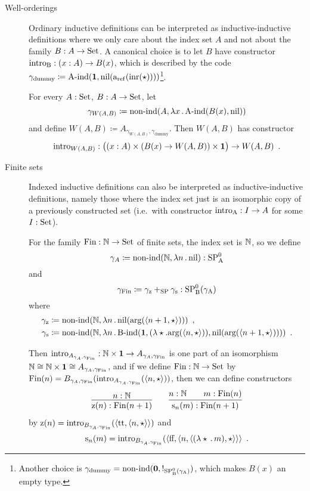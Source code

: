 \documentclass{article}
\begin{document}
\begin{description}
\item[Well-orderings] Ordinary inductive definitions can be
  interpreted as inductive-inductive definitions where we only care
  about the index set $A$ and not about the family $B : A \to \text{Set}$. A
  canonical choice is to let $B$ have constructor $\text{intro}_{\mathrm{B}} : (x : A)
  \to B(x)$, which is described by the code $\gamma_{\text{dummy}}
  \coloneqq \text{A-ind}(\mathbf{1},
  \text{nil}(\text{a}_{\mathrm{ref}}(\text{inr}(\star))))$\footnote{Another choice is
    $\gamma_{\text{dummy}} = \text{non-ind}(\mathbf{0}, !_{\text{SP}^{0}_{\mathrm{B}}(\gamma_{\mathrm{A}})})$, which makes $B(x)$
    an empty type.}.

  For every $A : \text{Set}$, $B : A \to \text{Set}$, let
  \[
  \gamma_{W(A, B)} \coloneqq \text{non-ind}(A, \lambda x\,.\,\text{A-ind}(B(x),\text{nil}))
  \]
  and define $W(A, B) \coloneqq A_{\gamma_{W(A, B)},
    \gamma_{\text{dummy}}}$.  Then $W(A, B)$ has constructor
  \[
  \text{intro}_{W(A, B)} : \big((x : A) \times (B(x) \to W(A, B)) \times \mathbf{1}\big) \to W(A, B) \enspace .
  \]

\item[Finite sets] Indexed inductive definitions can also be
  interpreted as inductive-inductive definitions, namely those where
  the index set just is an isomorphic copy of a previously constructed
  set (i.e.\ with constructor $\text{intro}_{\mathrm{A}} : I \to A$ for some $I : \text{Set}$).

  For the family $\text{Fin} : \mathbb{N} \to \text{Set}$ of finite sets, the index set
  is $\mathbb{N}$, so we define
  \[
  \gamma_A \coloneqq \text{non-ind}(\mathbb{N}, \lambda n\,.\,\text{nil}) : \text{SP}^{0}_{\mathrm{A}}
  \]
  and
  \[
  \gamma_{\text{Fin}} \coloneqq \gamma_{\text{z}} +_{\text{SP}} \gamma_{\text{s}} : \text{SP}^{0}_{\mathrm{B}}(\gamma_{\mathrm{A}})
  \]
  where
  \begin{align*}
    \gamma_{\text{z}} &\coloneqq \text{non-ind}(\mathbb{N}, \lambda n\,.\,\text{nil}(\text{arg}(\langle n + 1 , \star\rangle))) \enspace ,\\
    \gamma_{\text{s}} &\coloneqq \text{non-ind}(\mathbb{N}, \lambda n\,.\,\text{B-ind}(\mathbf{1}, (\lambda \star . \text{arg}(\langle n , \star\rangle)), \text{nil}(\text{arg}(\langle n + 1 , \star\rangle)))) \enspace .
  \end{align*} 

  Then $\text{intro}_{A_{\gamma_A, \gamma_{\text{Fin}}}} : \mathbb{N} \times \mathbf{1} \to
  A_{\gamma_A, \gamma_{\text{Fin}}}$ is one part of an isomorphism $\mathbb{N}
  \cong \mathbb{N} \times \mathbf{1} \cong A_{\gamma_A, \gamma_{\text{Fin}}}$, and if we
  define $\text{Fin} : \mathbb{N} \to \text{Set}$ by $\text{Fin}(n) = B_{\gamma_A,
    \gamma_{\text{Fin}}}(\text{intro}_{A_{\gamma_A,
    \gamma_{\text{Fin}}}}(\langle n , \star\rangle))$, then we can define
  constructors
  \begin{align*}
    \infer{\finzero{n} : \Fin(n + 1)}{n : \Nat} \qquad
\infer{\finsucc{n}{m} : \Fin(n + 1)}{n : \Nat & \quad m : \Fin(n)}
  \end{align*}
  by $\text{z}(n) = \text{intro}_{B_{\gamma_A,
      \gamma_{\text{Fin}}}}(\langle \text{tt} , \langle n , \star\rangle\rangle)$ and
  \[
  \text{s}_{n}(m) = \text{intro}_{B_{\gamma_A,
      \gamma_{\text{Fin}}}}(\langle \text{ff} , \langle n , \langle (\lambda
        \star\,.\,m) , \star\rangle\rangle\rangle \enspace .
  \]


\end{description}
\end{document}
